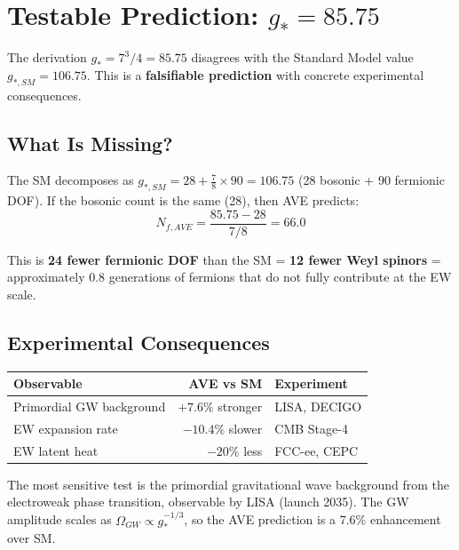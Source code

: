 \section{Testable Prediction: $g_* = 85.75$}
\label{sec:g_star_prediction}

The derivation $g_* = 7^3/4 = 85.75$ disagrees with the Standard
Model value $g_{*,SM} = 106.75$.  This is a \textbf{falsifiable
prediction} with concrete experimental consequences.

\subsection{What Is Missing?}

The SM decomposes as $g_{*,SM} = 28 + \frac{7}{8} \times 90 = 106.75$
(28 bosonic + 90 fermionic DOF).  If the bosonic count is the same
(28), then AVE predicts:
\begin{equation}
    N_{f,AVE} = \frac{85.75 - 28}{7/8} = 66.0
\end{equation}

This is \textbf{24 fewer fermionic DOF} than the SM = \textbf{12 fewer
Weyl spinors} = approximately 0.8 generations of fermions that do not
fully contribute at the EW scale.

\subsection{Experimental Consequences}

\begin{center}
\small
\begin{tabular}{lrl}
\toprule
\textbf{Observable} & \textbf{AVE vs SM} & \textbf{Experiment} \\
\midrule
Primordial GW background & $+7.6\%$ stronger & LISA, DECIGO \\
EW expansion rate & $-10.4\%$ slower & CMB Stage-4 \\
EW latent heat & $-20\%$ less & FCC-ee, CEPC \\
\bottomrule
\end{tabular}
\end{center}

The most sensitive test is the primordial gravitational wave
background from the electroweak phase transition, observable by
LISA (launch 2035).  The GW amplitude scales as $\Omega_{GW}
\propto g_*^{-1/3}$, so the AVE prediction is a 7.6\% enhancement
over SM.

